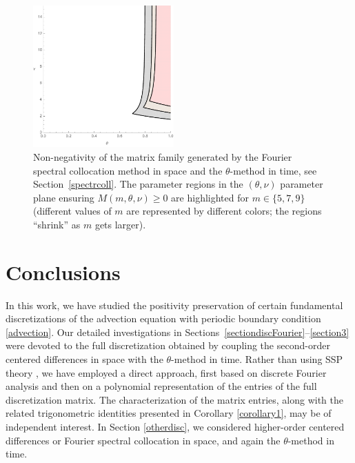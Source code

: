 \documentclass[a4paper]{article}
\newcommand{\te}{\theta}
\begin{document}
\begin{figure}
\begin{center}
\includegraphics[width=0.48\textwidth]{fig_spectral.pdf}
\caption{Non-negativity of the matrix family generated by the Fourier spectral collocation method in space and the $\theta$-method in time, see Section~\ref{spectrcoll}. The parameter regions in the $(\te,\nu)$ parameter plane ensuring $M(m,\te,\nu)\ge 0$ are highlighted for $m\in\{5, 7, 9\}$ (different values of $m$ are represented by different colors; the regions ``shrink'' as $m$ gets larger).}\label{fig_spectral}
\end{center}
\end{figure}


\section{Conclusions}\label{conclusions}

In this work, we have studied the positivity preservation of certain fundamental
discretizations of the advection equation with periodic boundary condition \eqref{advection}. 
Our detailed investigations in Sections~\ref{sectiondiscFourier}--\ref{section3}
were devoted to the  full discretization obtained by coupling the second-order centered
differences in space with the $\theta$-method in time.  
 Rather than using SSP theory \cite{SSPbook}, 
we have employed a direct
approach, first based on discrete Fourier analysis and then
on a polynomial representation of the entries of the full discretization matrix.
The characterization of the %
matrix entries, %
along with the related trigonometric identities
presented in Corollary \ref{corollary1}, may be of independent interest.
In Section \ref{otherdisc}, we considered higher-order centered
differences or Fourier spectral collocation in space, and again the $\theta$-method in time. 
\end{document}
